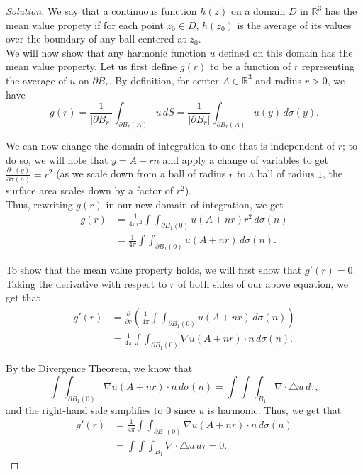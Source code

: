 \documentclass[11pt]{article}
\newenvironment{solution}
  {\renewcommand\qedsymbol{$\blacksquare$}\begin{proof}[Solution]}
  {\end{proof}}
\theoremstyle{definition}
\begin{document}
\begin{solution}

We say that a continuous function $h(z)$ on a domain $D$ in $\mathbb{R}^3$ has the mean value propety if for each point $z_0 \in D$, $h(z_0)$ is the 
average of its values over the boundary of any ball centered at $z_0$. \\

We will now show that any harmonic function $u$ defined on this domain has the mean value property. Let us first define $g(r)$ to be a 
function of $r$ representing the average of $u$ on $\partial B_r$. 
By definition, for center $A \in \mathbb{R}^3$ and radius $r > 0$, we have
\[ g(r) = \frac{1}{|\partial B_r|} \int_{\partial B_r(A)} u \, dS = \frac{1}{|\partial B_r|} \int_{\partial B_r(A)} u(y) \, d\sigma(y). \]

We can now change the domain of integration to one that is independent of $r$; to do so, we will note that $y = A + rn$ and 
apply a change of variables to get $\frac{\partial \sigma(y)}{\partial \sigma(n)} = r^2$ 
(as we scale down from a ball of radius $r$ to a ball of radius $1$, the surface area scales down by a factor of $r^2$). \\

Thus, rewriting $g(r)$ in our new domain of integration, we get
\begin{align*} g(r) &= \frac{1}{4\pi r^2} \int \int_{\partial B_1(0)} u(A+nr) r^2 \, d\sigma(n) \\
&= \frac{1}{4\pi} \int \int_{\partial B_1(0)} u(A+nr) \, d\sigma(n).\end{align*}

To show that the mean value property holds, we will first show that $g'(r) = 0$. Taking the derivative with respect to $r$ of both sides of our above equation, we get that
\begin{align*} g'(r) &= \frac{\partial}{\partial r}\left(\frac{1}{4\pi} \int \int_{\partial B_1(0)} u(A+nr) \, d\sigma(n)\right) \\
&= \frac{1}{4\pi} \int \int_{\partial B_1(0)} \nabla u(A + nr) \cdot n \, d\sigma(n).\end{align*}

By the Divergence Theorem, we know that \[ \int \int_{\partial B_1(0)} \nabla u(A + nr) \cdot n \, d\sigma(n) = \int\int\int_{B_1} \nabla \cdot \triangle u\, d\tau, \]
and the right-hand side simplifies to $0$ since $u$ is harmonic. Thus, we get that
\begin{align*} g'(r) &= \frac{1}{4\pi} \int \int_{\partial B_1(0)} \nabla u(A + nr) \cdot n \, d\sigma(n) \\
	&= \int\int\int_{B_1} \nabla \cdot \triangle u\, d\tau = 0.
\end{align*}


\end{solution}
\end{document}
